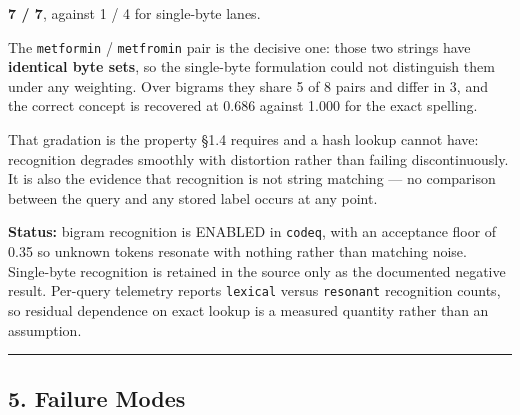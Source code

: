 \documentclass[
  11pt,
  a4paper,
]{article}
\begin{document}
\textbf{7 / 7}, against 1 / 4 for single-byte lanes.

The \texttt{metformin} / \texttt{metfromin} pair is the decisive one:
those two strings have \textbf{identical byte sets}, so the single-byte
formulation could not distinguish them under any weighting. Over bigrams
they share 5 of 8 pairs and differ in 3, and the correct concept is
recovered at 0.686 against 1.000 for the exact spelling.

That gradation is the property §1.4 requires and a hash lookup cannot
have: recognition degrades smoothly with distortion rather than failing
discontinuously. It is also the evidence that recognition is not string
matching --- no comparison between the query and any stored label occurs
at any point.

\textbf{Status:} bigram recognition is ENABLED in \texttt{codeq}, with
an acceptance floor of 0.35 so unknown tokens resonate with nothing
rather than matching noise. Single-byte recognition is retained in the
source only as the documented negative result. Per-query telemetry
reports \texttt{lexical} versus \texttt{resonant} recognition counts, so
residual dependence on exact lookup is a measured quantity rather than
an assumption.

\begin{center}\rule{0.5\linewidth}{0.5pt}\end{center}

\subsection{5. Failure Modes}\label{failure-modes}
\end{document}
